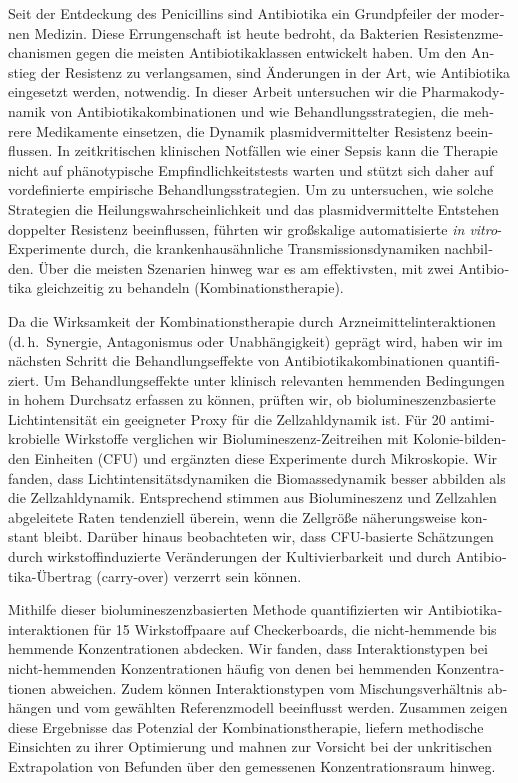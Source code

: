 \begin{otherlanguage}{ngerman}
  Seit der Entdeckung des Penicillins sind Antibiotika ein Grundpfeiler der modernen Medizin.
  Diese Errungenschaft ist heute bedroht, da Bakterien Resistenzmechanismen gegen die meisten Antibiotikaklassen entwickelt haben.
  Um den Anstieg der Resistenz zu verlangsamen, sind Änderungen in der Art, wie Antibiotika eingesetzt werden, notwendig.
  In dieser Arbeit untersuchen wir die Pharmakodynamik von Antibiotikakombinationen und wie Behandlungsstrategien, die mehrere Medikamente einsetzen, die Dynamik plasmidvermittelter Resistenz beeinflussen.
  In zeitkritischen klinischen Notfällen wie einer Sepsis kann die Therapie nicht auf phänotypische Empfindlichkeitstests warten und stützt sich daher auf vordefinierte empirische Behandlungsstrategien.
  Um zu untersuchen, wie solche Strategien die Heilungswahrscheinlichkeit und das plasmidvermittelte Entstehen doppelter Resistenz beeinflussen, führten wir großskalige automatisierte \textit{in vitro}-Experimente durch, die krankenhausähnliche Transmissionsdynamiken nachbilden.
  Über die meisten Szenarien hinweg war es am effektivsten, mit zwei Antibiotika gleichzeitig zu behandeln (Kombinationstherapie).

  Da die Wirksamkeit der Kombinationstherapie durch Arzneimittelinteraktionen (d.\,h.\ Synergie, Antagonismus oder Unabhängigkeit) geprägt wird, haben wir im nächsten Schritt die Behandlungseffekte von Antibiotikakombinationen quantifiziert.
  Um Behandlungseffekte unter klinisch relevanten hemmenden Bedingungen in hohem Durchsatz erfassen zu können, prüften wir, ob biolumineszenzbasierte Lichtintensität ein geeigneter Proxy für die Zellzahldynamik ist.
  Für 20 antimikrobielle Wirkstoffe verglichen wir Biolumineszenz-Zeitreihen mit Kolonie-bildenden Einheiten (CFU) und ergänzten diese Experimente durch Mikroskopie.
  Wir fanden, dass Lichtintensitätsdynamiken die Biomassedynamik besser abbilden als die Zellzahldynamik.
  Entsprechend stimmen aus Biolumineszenz und Zellzahlen abgeleitete Raten tendenziell überein, wenn die Zellgröße näherungsweise konstant bleibt.
  Darüber hinaus beobachteten wir, dass CFU-basierte Schätzungen durch wirkstoffinduzierte Veränderungen der Kultivierbarkeit und durch Antibiotika-Übertrag (carry-over) verzerrt sein können.

  Mithilfe dieser biolumineszenzbasierten Methode quantifizierten wir Antibiotikainteraktionen für 15 Wirkstoffpaare auf Checkerboards, die nicht-hemmende bis hemmende Konzentrationen abdecken.
  Wir fanden, dass Interaktionstypen bei nicht-hemmenden Konzentrationen häufig von denen bei hemmenden Konzentrationen abweichen.
  Zudem können Interaktionstypen vom Mischungsverhältnis abhängen und vom gewählten Referenzmodell beeinflusst werden.
  Zusammen zeigen diese Ergebnisse das Potenzial der Kombinationstherapie, liefern methodische Einsichten zu ihrer Optimierung und mahnen zur Vorsicht bei der unkritischen Extrapolation von Befunden über den gemessenen Konzentrationsraum hinweg.
\end{otherlanguage}
